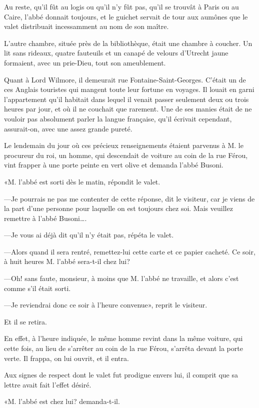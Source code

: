 Au reste, qu'il fût au logis ou qu'il n'y fût pas, qu'il se trouvât à Paris ou au Caire, l'abbé donnait toujours, et le guichet servait de tour aux aumônes que le valet distribuait incessamment au nom de son maître. 

L'autre chambre, située près de la bibliothèque, était une chambre à coucher. Un lit sans rideaux, quatre fauteuils et un canapé de velours d'Utrecht jaune formaient, avec un prie-Dieu, tout son ameublement. 

Quant à Lord Wilmore, il demeurait rue Fontaine-Saint-Georges. C'était un de ces Anglais touristes qui mangent toute leur fortune en voyages. Il louait en garni l'appartement qu'il habitait dans lequel il venait passer seulement deux ou trois heures par jour, et où il ne couchait que rarement. Une de ses manies était de ne vouloir pas absolument parler la langue française, qu'il écrivait cependant, assurait-on, avec une assez grande pureté.  

Le lendemain du jour où ces précieux renseignements étaient parvenus à M. le procureur du roi, un homme, qui descendait de voiture au coin de la rue Férou, vint frapper à une porte peinte en vert olive et demanda l'abbé Busoni. 

«M. l'abbé est sorti dès le matin, répondit le valet. 

—Je pourrais ne pas me contenter de cette réponse, dit le visiteur, car je viens de la part d'une personne pour laquelle on est toujours chez soi. Mais veuillez remettre à l'abbé Busoni\dots. 

—Je vous ai déjà dit qu'il n'y était pas, répéta le valet. 

—Alors quand il sera rentré, remettez-lui cette carte et ce papier cacheté. Ce soir, à huit heures M. l'abbé sera-t-il chez lui? 

—Oh! sans faute, monsieur, à moins que M. l'abbé ne travaille, et alors c'est comme s'il était sorti. 

—Je reviendrai donc ce soir à l'heure convenue», reprit le visiteur. 

Et il se retira. 

En effet, à l'heure indiquée, le même homme revint dans la même voiture, qui cette fois, au lieu de s'arrêter au coin de la rue Férou, s'arrêta devant la porte verte. Il frappa, on lui ouvrit, et il entra. 

Aux signes de respect dont le valet fut prodigue envers lui, il comprit que sa lettre avait fait l'effet désiré. 

«M. l'abbé est chez lui? demanda-t-il. 

